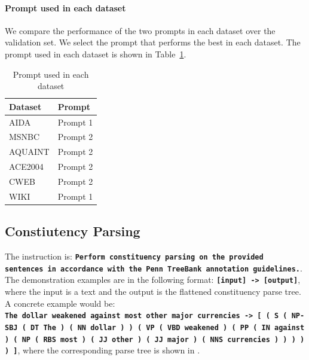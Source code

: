 \paragraph{Prompt used in each dataset}

We compare the performance of the two prompts in each dataset over the validation set.
We select the prompt that performs the best in each dataset.
The prompt used in each dataset is shown in Table~\ref{tab:prompt}.

\begin{table}[h!]
    \centering
    \begin{tabular}{l|l}
        \toprule
        Dataset & Prompt \\
        \midrule
        \textsc{AIDA} & Prompt 1 \\
        \textsc{MSNBC} & Prompt 2 \\
        \textsc{AQUAINT} & Prompt 2 \\
        \textsc{ACE2004} & Prompt 2 \\
        \textsc{CWEB} & Prompt 2 \\
        \textsc{WIKI} & Prompt 1 \\
        \bottomrule
    \end{tabular}
    \caption{Prompt used in each dataset}
    \label{tab:prompt}
\end{table}

\subsection{Constiutency Parsing}
The instruction is:
\textbf{\texttt{Perform constituency parsing on the provided sentences in accordance with the Penn TreeBank annotation guidelines.}}.
%
The demonstration examples are in the following format:
\textbf{\texttt{[input] -> [output]}}, where the input is a text and the output is the flattened constituency parse tree.
A concrete example would be: \\
\textbf{\texttt{The dollar weakened against most other major currencies -> [ ( S ( NP-SBJ ( DT The ) ( NN dollar ) ) ( VP ( VBD weakened ) ( PP ( IN against ) ( NP ( RBS most ) ( JJ other ) ( JJ major ) ( NNS currencies ) ) ) ) ) ]}},
where the corresponding parse tree is shown in .




